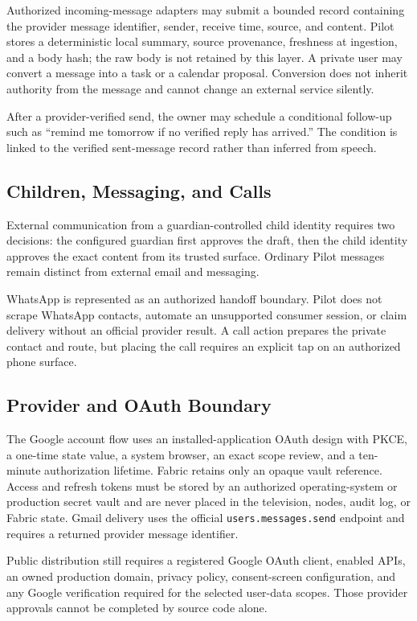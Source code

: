 Authorized incoming-message adapters may submit a bounded record containing the
provider message identifier, sender, receive time, source, and content.  Pilot
stores a deterministic local summary, source provenance, freshness at ingestion,
and a body hash; the raw body is not retained by this layer.  A private user may
convert a message into a task or a calendar proposal.  Conversion does not inherit
authority from the message and cannot change an external service silently.

After a provider-verified send, the owner may schedule a conditional follow-up
such as ``remind me tomorrow if no verified reply has arrived.''  The condition
is linked to the verified sent-message record rather than inferred from speech.

\subsection{Children, Messaging, and Calls}

External communication from a guardian-controlled child identity requires two
decisions: the configured guardian first approves the draft, then the child
identity approves the exact content from its trusted surface.  Ordinary Pilot
messages remain distinct from external email and messaging.

WhatsApp is represented as an authorized handoff boundary.  Pilot does not scrape
WhatsApp contacts, automate an unsupported consumer session, or claim delivery
without an official provider result.  A call action prepares the private contact
and route, but placing the call requires an explicit tap on an authorized phone
surface.

\subsection{Provider and OAuth Boundary}

The Google account flow uses an installed-application OAuth design with PKCE,
a one-time state value, a system browser, an exact scope review, and a ten-minute
authorization lifetime.  Fabric retains only an opaque vault reference.  Access
and refresh tokens must be stored by an authorized operating-system or production
secret vault and are never placed in the television, nodes, audit log, or Fabric
state.  Gmail delivery uses the official \texttt{users.messages.send} endpoint
and requires a returned provider message identifier.

Public distribution still requires a registered Google OAuth client, enabled
APIs, an owned production domain, privacy policy, consent-screen configuration,
and any Google verification required for the selected user-data scopes.  Those
provider approvals cannot be completed by source code alone.

